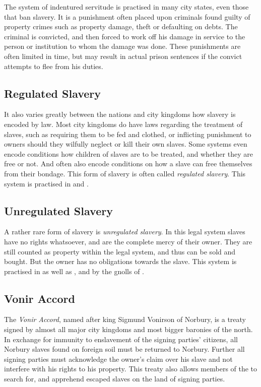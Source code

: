 The system of indentured servitude is practised in many city states, even
those that ban slavery. It is a punishment often placed upon criminals found
guilty of property crimes such as property damage, theft or defaulting on
debts. The criminal is convicted, and then forced to work off his damage in
service to the person or institution to whom the damage was done. These
punishments are often limited in time, but may result in actual prison
sentences if the convict attempts to flee from his duties.

\subsection{Regulated Slavery}
\label{sec:Regulated Slavery}

It also varies greatly between the nations and city kingdoms how slavery is
encoded by law. Most city kingdoms do have laws regarding the treatment of
slaves, such as requiring them to be fed and clothed, or inflicting punishment
to owners should they wilfully neglect or kill their own slaves. Some systems
even encode conditions how children of slaves are to be treated, and whether
they are free or not. And often also encode conditions on how a slave can free
themselves from their bondage. This form of slavery is often called
\emph{regulated slavery}. This system is practised in 
and .

\subsection{Unregulated Slavery}
\label{sec:Unregulated Slavery}

A rather rare form of slavery is \emph{unregulated slavery}. In this legal
system slaves have no rights whatsoever, and are the complete mercy of their
owner. They are still counted as property within the legal system, and thus
can be sold and bought. But the owner has no obligations towards the slave.
This system is practised in  as well as
, and by the gnolls of .

\subsection{Vonir Accord}
\label{sec:Vonir Accord}

The \emph{Vonir Accord}, named after king Sigmund Vonirson of Norbury, is a
treaty signed by almost all major city kingdoms and most bigger baronies of
the north. In exchange for immunity to enslavement of the signing parties'
citizens, all Norbury slaves found on foreign soil must be returned to
Norbury. Further all signing parties must acknowledge the owner's claim over
his slave and not interfere with his rights to his property. This treaty
also allows members of the  to search for, and
apprehend escaped slaves on the land of signing parties.
